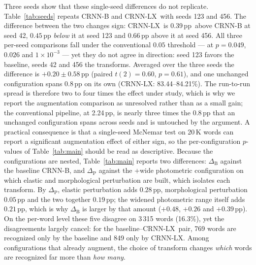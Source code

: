 \documentclass{ws-ijprai}
\newcommand{\ours}{CRNN-LX}            %
\newcommand{\deltawa}{0.39\,pp}        %
\newcommand{\anchordelta}{2.24}        %
\begin{document}
Three seeds show that these single-seed differences do not replicate.
Table~\ref{tab:seeds} repeats CRNN-B and \ours\ with
seeds 123 and 456. The difference between the two changes sign:
\ours\ is \deltawa\ above CRNN-B at seed 42, $0.45$\,pp
\emph{below} it at seed 123 and $0.66$\,pp above it at seed 456. All
three per-seed comparisons fall under the conventional $0.05$ threshold ---
at $p=0.049$, $0.026$ and $1\times10^{-3}$ --- yet they do not agree in
direction: seed 123 favors the baseline, seeds 42 and 456 the transforms. Averaged over the three
seeds the difference is $+0.20\pm0.58$\,pp (paired $t(2)=0.60$,
$p=0.61$), and one unchanged configuration spans 0.8\,pp on its own
(\ours: 83.44--84.21\%).
The run-to-run spread is therefore two to four times the effect under
study, which is why we report the augmentation comparison as
unresolved rather than as a small gain; the conventional pipeline, at
\anchordelta\,pp, is nearly three times the 0.8\,pp that an unchanged
configuration spans across seeds and is untouched by the argument. A practical consequence is that a
single-seed McNemar test on 20\,K words can report a significant
augmentation effect of either sign, so the per-configuration
$p$-values of Table~\ref{tab:main} should be read as descriptive.
Because the configurations are nested,
Table~\ref{tab:main} reports two differences: $\Delta_{\mathrm{B}}$
against the baseline CRNN-B, and $\Delta_{\mathrm{P}}$ against the
$+$wide photometric configuration on which elastic and morphological
perturbation are built, which isolates each transform. By
$\Delta_{\mathrm{P}}$, elastic perturbation adds $0.28$\,pp,
morphological perturbation $0.05$\,pp and the two together
$0.19$\,pp; the widened photometric range itself adds $0.21$\,pp,
which is why $\Delta_{\mathrm{B}}$ is larger by that amount ($+0.48$,
$+0.26$ and $+0.39$\,pp). On the per-word level these five disagree on
3\,315 words (16.3\%), yet the disagreements largely cancel: for the
baseline--\ours\ pair, 769 words are recognized only by the baseline
and 849 only by \ours. Among configurations that
already augment, the choice of transform changes \emph{which} words are
recognized far more than \emph{how many}.
\end{document}
